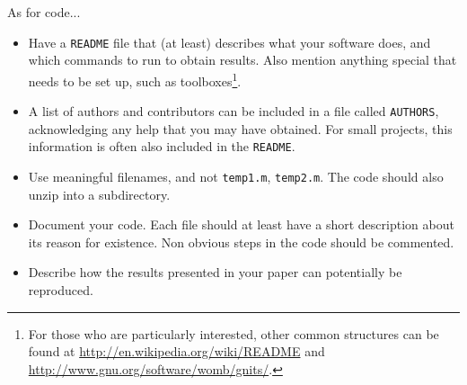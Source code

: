 \documentclass[10pt,conference,compsocconf]{IEEEtran}
\begin{document}
As for code...
\begin{itemize}
\item Have a \texttt{README} file that (at least) describes what your
  software does, and which commands to run to obtain results. Also
  mention anything special that needs to be set up, such as
  toolboxes\footnote{For those who are
  particularly interested, other common structures can be found at
  \url{http://en.wikipedia.org/wiki/README} and
  \url{http://www.gnu.org/software/womb/gnits/}.}.
\item A list of authors and contributors can be included in a file
  called \texttt{AUTHORS}, acknowledging any help that you may have
  obtained. For small projects, this information is often also
  included in the \texttt{README}.
\item Use meaningful filenames, and not \texttt{temp1.m},
  \texttt{temp2.m}. The code should also unzip into a subdirectory.
\item Document your code. Each file should at least have a short
  description about its reason for existence. Non obvious steps in the
  code should be commented.
\item Describe how the results presented in your paper can potentially
  be reproduced.
\end{itemize}
\end{document}

